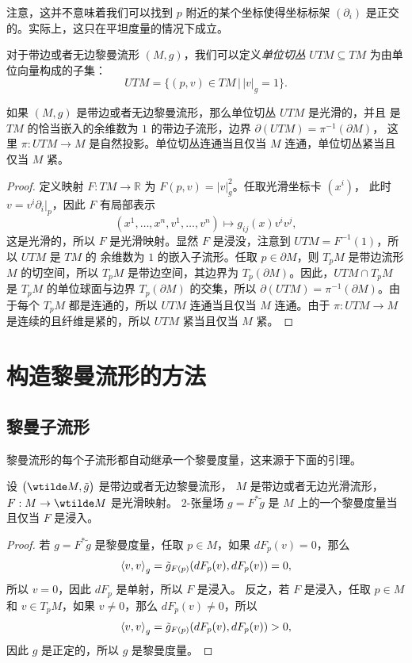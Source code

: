 注意，这并不意味着我们可以找到 $p$ 附近的某个坐标使得坐标标架 $(\partial_i)$
是正交的。实际上，这只在平坦度量的情况下成立。

对于带边或者无边黎曼流形 $(M,g)$，我们可以定义\emph{单位切丛} $UTM\subseteq TM$
为由单位向量构成的子集：
\begin{equation}
  UTM=\{(p,v)\in TM\,|\, |v|_g=1\}.
\end{equation}

\begin{proposition}
如果 $(M,g)$ 是带边或者无边黎曼流形，那么单位切丛 $UTM$ 是光滑的，并且
是 $TM$ 的恰当嵌入的余维数为 $1$ 的带边子流形，边界 $\partial(UTM)=\pi^{-1}(\partial M)$，
这里 $\pi:UTM\to M$ 是自然投影。单位切丛连通当且仅当 $M$ 连通，单位切丛紧当且仅当 $M$ 紧。
\end{proposition}
\begin{proof}
  定义映射 $F:TM\to \mathbb{R}$ 为 $F(p,v)=|v|_g^2$。任取光滑坐标卡 $(x^i)$，
  此时 $v=v^i\partial_i|_p$，因此 $F$ 有局部表示
  \[
    (x^1,\dots,x^n,v^1,\dots,v^n)\mapsto g_{ij}(x)v^iv^j,
  \]
  这是光滑的，所以 $F$ 是光滑映射。显然 $F$ 是浸没，注意到 $UTM=F^{-1}(1)$，所以 $UTM$ 是 $TM$ 的
  余维数为 $1$ 的嵌入子流形。任取 $p\in\partial M$，则 $T_pM$ 是带边流形 $M$ 的切空间，所以 $T_pM$ 是带边空间，其边界为
  $T_p(\partial M)$。因此，$UTM\cap T_pM$ 是 $T_pM$ 的单位球面与边界 $T_p(\partial M)$ 的交集，所以
  $\partial(UTM)=\pi^{-1}(\partial M)$。由于每个 $T_pM$ 都是连通的，所以 $UTM$ 连通当且仅当 $M$ 连通。由于 $\pi:UTM\to M$ 是连续的且纤维是紧的，所以 $UTM$ 紧当且仅当 $M$ 紧。
\end{proof}



\section{构造黎曼流形的方法}

\subsection{黎曼子流形}

黎曼流形的每个子流形都自动继承一个黎曼度量，这来源于下面的引理。

\begin{lemma}
  设 $\bigl(\wtilde M,\tilde g\bigr)$ 是带边或者无边黎曼流形，
  $M$ 是带边或者无边光滑流形，$F:M\to\wtilde M$ 是光滑映射。
  $2$-张量场 $g=F^*\tilde{g}$ 是 $M$ 上的一个黎曼度量当且仅当
  $F$ 是浸入。
\end{lemma}
\begin{proof}
  若 $g=F^*\tilde{g}$ 是黎曼度量，任取 $p\in M$，如果 $dF_p(v)=0$，那么
  \[
    \left\langle v,v\right\rangle_g=\tilde g_{F(p)}(dF_p(v),dF_p(v))=0,
  \] 
  所以 $v=0$，因此 $dF_p$ 是单射，所以 $F$ 是浸入。
  反之，若 $F$ 是浸入，任取 $p\in M$ 和 $v\in T_pM$，如果 $v\neq 0$，那么
  $dF_p(v)\neq 0$，所以
  \[
    \left\langle v,v\right\rangle_g=\tilde g_{F(p)}(dF_p(v),dF_p(v))>0,
  \]
  因此 $g$ 是正定的，所以 $g$ 是黎曼度量。
\end{proof}

